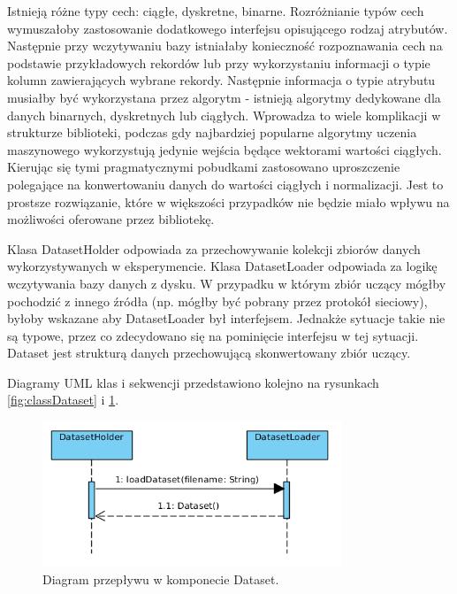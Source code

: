 \documentclass[12pt]{article}
\begin{document}
Istnieją różne typy cech: ciągłe, dyskretne, binarne. Rozróżnianie typów cech wymuszałoby zastosowanie dodatkowego interfejsu opisującego rodzaj atrybutów. Następnie przy wczytywaniu bazy istniałaby konieczność rozpoznawania cech na podstawie przykładowych rekordów lub przy wykorzystaniu informacji o typie kolumn zawierających wybrane rekordy. Następnie informacja o typie atrybutu musiałby być wykorzystana przez algorytm - istnieją algorytmy dedykowane dla danych binarnych, dyskretnych lub ciągłych. Wprowadza to wiele komplikacji w strukturze biblioteki, podczas gdy najbardziej popularne algorytmy uczenia maszynowego wykorzystują jedynie wejścia będące wektorami wartości ciągłych. Kierując się tymi pragmatycznymi pobudkami zastosowano uproszczenie polegające na konwertowaniu danych do wartości ciągłych i normalizacji. Jest to prostsze rozwiązanie, które w większości przypadków nie będzie miało wpływu na możliwości oferowane przez bibliotekę.

Klasa DatasetHolder odpowiada za przechowywanie kolekcji zbiorów danych wykorzystywanych w eksperymencie. Klasa DatasetLoader odpowiada za logikę wczytywania bazy danych z dysku. W przypadku w którym zbiór uczący mógłby pochodzić z innego źródła (np. mógłby być pobrany przez protokół sieciowy), byłoby wskazane aby DatasetLoader był interfejsem. Jednakże sytuacje takie nie są typowe, przez co zdecydowano się na pominięcie interfejsu w tej sytuacji. Dataset jest strukturą danych przechowującą skonwertowany zbiór uczący.

Diagramy UML klas i sekwencji przedstawiono kolejno na rysunkach \ref{fig:classDataset} i \ref{fig:sequenceDataset}.

\newpage
\begin{figure}[!h]
	\centering
	\includegraphics[width=0.8\textwidth]{img/sequenceDataset.png}
	\caption{Diagram przepływu w komponecie Dataset.}
	\label{fig:sequenceDataset}
\end{figure}
\end{document}

